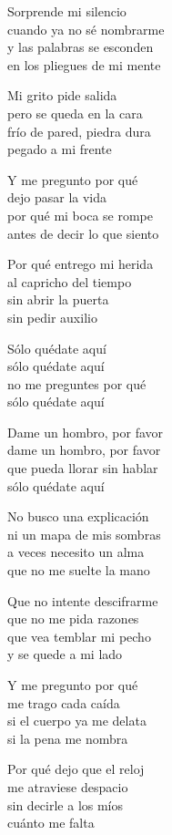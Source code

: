 \begin{lyrics}
Sorprende mi silencio\\
cuando ya no sé nombrarme\\
y las palabras se esconden\\
en los pliegues de mi mente

Mi grito pide salida\\
pero se queda en la cara\\
frío de pared, piedra dura\\
pegado a mi frente

Y me pregunto por qué\\
dejo pasar la vida\\
por qué mi boca se rompe\\
antes de decir lo que siento

Por qué entrego mi herida\\
al capricho del tiempo\\
sin abrir la puerta\\
sin pedir auxilio

Sólo quédate aquí\\
sólo quédate aquí\\
no me preguntes por qué\\
sólo quédate aquí

Dame un hombro, por favor\\
dame un hombro, por favor\\
que pueda llorar sin hablar\\
sólo quédate aquí

No busco una explicación\\
ni un mapa de mis sombras\\
a veces necesito un alma\\
que no me suelte la mano

Que no intente descifrarme\\
que no me pida razones\\
que vea temblar mi pecho\\
y se quede a mi lado

Y me pregunto por qué\\
me trago cada caída\\
si el cuerpo ya me delata\\
si la pena me nombra

Por qué dejo que el reloj\\
me atraviese despacio\\
sin decirle a los míos\\
cuánto me falta


\end{lyrics}
